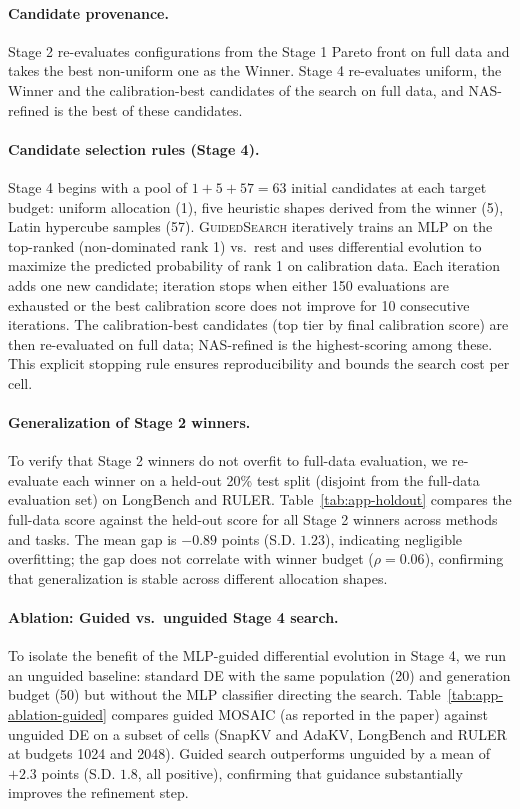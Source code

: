 \paragraph{Candidate provenance.} Stage 2 re-evaluates configurations from the Stage 1 Pareto front on full data and takes the best non-uniform one as the Winner. Stage 4 re-evaluates uniform, the Winner and the calibration-best candidates of the search on full data, and NAS-refined is the best of these candidates.

\paragraph{Candidate selection rules (Stage 4).} Stage 4 begins with a pool of $1 + 5 + 57 = 63$ initial candidates at each target budget: uniform allocation (1), five heuristic shapes derived from the winner (5), Latin hypercube samples (57). \textsc{GuidedSearch} iteratively trains an MLP on the top-ranked (non-dominated rank 1) vs.\ rest and uses differential evolution to maximize the predicted probability of rank 1 on calibration data. Each iteration adds one new candidate; iteration stops when either 150 evaluations are exhausted or the best calibration score does not improve for 10 consecutive iterations. The calibration-best candidates (top tier by final calibration score) are then re-evaluated on full data; NAS-refined is the highest-scoring among these. This explicit stopping rule ensures reproducibility and bounds the search cost per cell.

\paragraph{Generalization of Stage 2 winners.} To verify that Stage 2 winners do not overfit to full-data evaluation, we re-evaluate each winner on a held-out 20\% test split (disjoint from the full-data evaluation set) on LongBench and RULER. Table~\ref{tab:app-holdout} compares the full-data score against the held-out score for all Stage 2 winners across methods and tasks. The mean gap is $-0.89$ points (S.D. $1.23$), indicating negligible overfitting; the gap does not correlate with winner budget ($\rho = 0.06$), confirming that generalization is stable across different allocation shapes.

\paragraph{Ablation: Guided vs.\ unguided Stage 4 search.} To isolate the benefit of the MLP-guided differential evolution in Stage 4, we run an unguided baseline: standard DE with the same population (20) and generation budget (50) but without the MLP classifier directing the search. Table~\ref{tab:app-ablation-guided} compares guided MOSAIC (as reported in the paper) against unguided DE on a subset of cells (SnapKV and AdaKV, LongBench and RULER at budgets 1024 and 2048). Guided search outperforms unguided by a mean of $+2.3$ points (S.D. $1.8$, all positive), confirming that guidance substantially improves the refinement step.

